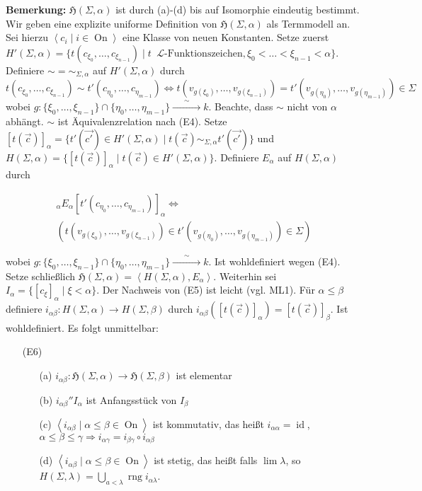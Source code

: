 \documentclass[a4paper,fontsize=11pt]{scrartcl}
\newcommand{\simrightarrow}{\xrightarrow{\phantom{\sim}\sim\phantom{\sim}}}
\newcommand{\rng}{\operatorname{rng}}
\newcommand{\On}{\operatorname{On}}
\newcommand{\id}{\operatorname{id}}
\begin{document}
{\bf Bemerkung:} $\mathfrak{H}(\Sigma,\alpha)$ ist durch (a)-(d) bis
auf Isomorphie eindeutig bestimmt. Wir geben eine explizite uniforme
Definition von $\mathfrak{H}(\Sigma,\alpha)$ als Termmodell an. Sei
hierzu $\left<c_i\mid i\in\On\right>$ eine Klasse von neuen
Konstanten. Setze zuerst
$H'(\Sigma,\alpha)=\{t(c_{\xi_0},\ldots,c_{\xi_{n-1}})\mid
t\phantom{a}\mathcal{L} \mbox{-Funktionszeichen},
\xi_0<\ldots<\xi_{n-1}<\alpha\}$. Definiere
$\sim=\sim_{\Sigma,\alpha}$ auf $H'(\Sigma,\alpha)$ durch
$$t(c_{\xi_0},\ldots,c_{\xi_{n-1}})\sim
t'(c_{\eta_0},\ldots,c_{\eta_{m-1}}) \Leftrightarrow
t(v_{g(\xi_0)},\ldots,v_{g(\xi_{n-1})}) =
t'(v_{g(\eta_0)},\ldots,v_{g(\eta_{m-1})}) \in \Sigma$$ wobei $g :
\{\xi_0, \ldots, \xi_{n-1}\} \cap
\{\eta_0,\ldots,\eta_{m-1}\}\simrightarrow k$. Beachte,
dass $\sim$ nicht von $\alpha$ abhängt. $\sim$ ist Äquivalenzrelation
nach (E4). Setze $[t(\vec{c})]_\alpha=\{t'(\vec{c'})\in
H'(\Sigma,\alpha)\mid t(\vec{c})\sim_{\Sigma,\alpha} t'(\vec{c'})\}$ und
$H(\Sigma,\alpha)=\{[t(\vec{c})]_\alpha\mid t(\vec{c})\in
H'(\Sigma,\alpha)\}$. Definiere $E_\alpha$ auf $H(\Sigma,\alpha)$
durch

\begin{eqnarray*}
[t(c_{\xi_0},\ldots,c_{\xi_{n-1}})]_\alpha E_\alpha
[t'(c_{\eta_0},\ldots,c_{\eta_{m-1}})]_\alpha \Leftrightarrow \phantom{aaaaaaaaaaaa}\\
(t(v_{g(\xi_0)},\ldots,v_{g(\xi_{n-1})})\in
t'(v_{g(\eta_0)},\ldots,v_{g(\eta_{m-1})})\in\Sigma)
\end{eqnarray*}

wobei $g:\{\xi_0,\ldots,\xi_{n-1}\}\cap\{\eta_0,\ldots,\eta_{m-1}\}
\simrightarrow k$. Ist wohldefiniert wegen (E4). Setze
schließlich
$\mathfrak{H}(\Sigma,\alpha)=\left<H(\Sigma,\alpha),E_\alpha\right>$. Weiterhin
sei $I_\alpha=\{[c_\xi]_\alpha\mid \xi<\alpha\}$. Der Nachweis von (E5)
ist leicht (vgl. ML1). Für $\alpha\le\beta$ definiere
$i_{\alpha\beta}:H(\Sigma,\alpha)\rightarrow H(\Sigma,\beta)$ durch
$i_{\alpha\beta}([t(\vec{c})]_\alpha)=[t(\vec{c})]_\beta$. Ist
wohldefiniert. Es folgt unmittelbar:
\begin{itemize}
\item[(E6)]
  \begin{itemize}
  \item[(a)] $i_{\alpha\beta}:\mathfrak{H}(\Sigma,\alpha) \rightarrow
    \mathfrak{H}(\Sigma,\beta)$ ist elementar
  \item[(b)] $i_{\alpha\beta}''I_\alpha$ ist Anfangsstück von $I_\beta$
  \item[(c)] $\left<i_{\alpha\beta}\mid \alpha\le\beta\in\On\right>$ ist
    kommutativ, das heißt $i_{\alpha\alpha}=\id$,
    $\alpha\le\beta\le\gamma\Rightarrow
    i_{\alpha\gamma}=i_{\beta\gamma}\circ i_{\alpha\beta}$
  \item[(d)] $\left<i_{\alpha\beta}\mid\alpha\le\beta\in\On\right>$ ist
    stetig, das heißt falls $\lim\lambda$, so
    $H(\Sigma,\lambda)=\bigcup\limits_{a<\lambda}\rng
    i_{\alpha\lambda}$.
  \end{itemize}
\end{itemize}
\end{document}
